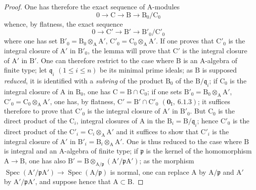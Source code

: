 \begin{proof}
One has therefore the exact sequence of $\mathrm{A}$-modules
\[
  0\to\mathrm{C}\to\mathrm{B}\to\mathrm{B}_0/\mathrm{C}_0
\]
whence, by flatness, the exact sequence
\[
  0\to\mathrm{C}'\to\mathrm{B}'\to\mathrm{B}'_0/\mathrm{C}'_0
\]
where one has set $\mathrm{B}'_0=\mathrm{B}_0\otimes_\mathrm{A}\mathrm{A}'$, $\mathrm{C}'_0=\mathrm{C}_0\otimes_\mathrm{A}\mathrm{A}'$. If one proves that $\mathrm{C}'_0$ is the integral
closure of $\mathrm{A}'$ in $\mathrm{B}'_0$, the lemma  will prove that $\mathrm{C}'$ is the integral
closure of $\mathrm{A}'$ in $\mathrm{B}'$. One can therefore restrict to the case where $\mathrm{B}$ is an $\mathrm{A}$-algebra of
finite type; let $\mathfrak{q}_i$ $(1\leqslant i\leqslant n)$ be its minimal prime ideals; as $\mathrm{B}$
is supposed \emph{reduced}, it is identified with a \emph{subring} of the product $\mathrm{B}_0$ of the $\mathrm{B}/\mathfrak{q}_i$; if $\mathrm{C}_0$ is the integral
closure of $\mathrm{A}$ in $\mathrm{B}_0$, one has $\mathrm{C}=\mathrm{B}\cap\mathrm{C}_0$; if one sets $\mathrm{B}'_0=\mathrm{B}_0\otimes_\mathrm{A}\mathrm{A}'$, $\mathrm{C}'_0=\mathrm{C}_0\otimes_\mathrm{A}\mathrm{A}'$, one has,
by flatness, $\mathrm{C}'=\mathrm{B}'\cap\mathrm{C}'_0$ $(\mathbf{0}_\mathrm{I},~6.1.3)$; it suffices therefore to prove that $\mathrm{C}'_0$ is the integral
closure of $\mathrm{A}'$ in $\mathrm{B}'_0$. But $\mathrm{C}_0$ is the direct product of the $\mathrm{C}_i$, integral closures of $\mathrm{A}$
in the $\mathrm{B}_i=\mathrm{B}/\mathfrak{q}_i$; hence $\mathrm{C}'_0$ is the direct product of the $\mathrm{C}'_i=\mathrm{C}_i\otimes_\mathrm{A}\mathrm{A}'$ and it suffices to show
that $\mathrm{C}'_i$ is the integral closure of $\mathrm{A}'$ in $\mathrm{B}'_i=\mathrm{B}_i\otimes_\mathrm{A}\mathrm{A}'$. One is thus reduced to the case
where $\mathrm{B}$ is integral and an $\mathrm{A}$-algebra of finite type; if $\mathfrak{p}$ is the kernel of the homomorphism $\mathrm{A}\to\mathrm{B}$,
one has also $\mathrm{B}'=\mathrm{B}\otimes_{\mathrm{A}/\mathfrak{p}}(\mathrm{A}'/\mathfrak{p}\mathrm{A}')$; as the morphism $\operatorname{Spec}(\mathrm{A}'/\mathfrak{p}\mathrm{A}')\to\operatorname{Spec}(\mathrm{A}/\mathfrak{p})$ is
normal, one can replace $\mathrm{A}$ by $\mathrm{A}/\mathfrak{p}$ and $\mathrm{A}'$ by $\mathrm{A}'/\mathfrak{p}\mathrm{A}'$, and suppose hence
that $\mathrm{A}\subset\mathrm{B}$.



\end{proof}
